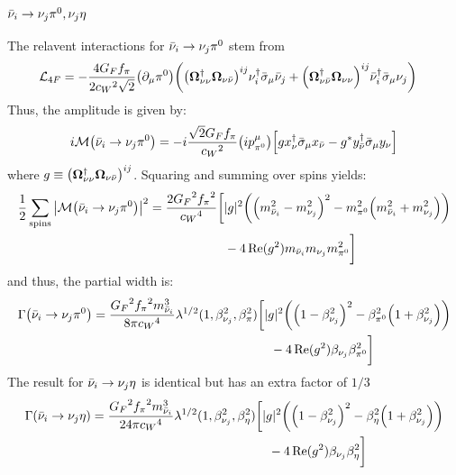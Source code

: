
\subsubsection{\texorpdfstring{\(\bar{\nu}_{i}\to\nu_{j}\pi^{0},\nu_{j}\eta\)}{RH-Neutrino to LH-Neutrino and Neutral Pion}}

The relavent interactions for \(\bar{\nu}_{i}\to\nu_{j}\pi^{0}\) stem from
\begin{align}
    \mathcal{L}_{4F} & = -\frac{4{G_{F}}{f_{\pi}}}{2{c_{W}}^{2}\sqrt{2}}\qty(\partial_{\mu}{\pi^{0}})
    \qty(\qty(\bm{\Omega}_{\nu\nu}^{\dagger}\bm{\Omega}_{\nu\bar{\nu}})^{ij}
    \nu_{i}^{\dagger}
    \bar{\sigma}_{\mu}
    \bar{\nu}_{j}
    +\qty(\bm{\Omega}_{\nu\bar{\nu}}^{\dagger}\bm{\Omega}_{\nu\nu})^{ij}\bar{\nu}_{i}^{\dagger}
    \bar{\sigma}_{\mu}
    \nu_{j}
    )
\end{align}
Thus, the amplitude is given by:
\begin{align}
    i\mathcal{M}\qty(\bar{\nu}_{i}\to\nu_{j}\pi^{0})
    =
    -i\frac{\sqrt{2}{G_{F}}{f_{\pi}}}{{c_{W}}^{2}}\qty(i p^{\mu}_{{\pi^{0}}})
    \qty[
    gx^{\dagger}_{\nu}\bar{\sigma}_{\mu}x_{\bar{\nu}}
    -
    g^{*}y^{\dagger}_{\bar{\nu}}\bar{\sigma}_{\mu}y_{\nu}
    ]
\end{align}
where \(g\equiv \qty(\bm{\Omega}_{\nu\nu}^{\dagger}\bm{\Omega}_{\nu\bar{\nu}})^{ij}\).
Squaring and summing over spins yields:
\begin{align}
    \frac{1}{2}\sum_{\mathrm{spins}}\qty|\mathcal{M}\qty(\bar{\nu}_{i}\to\nu_{j}\pi^{0})|^{2}
     & =
    \frac{2{G_{F}}^{2}{f_{\pi}}^{2}}{{c_{W}}^{4}}
    \bigg{[}
    |g|^{2}\qty(\qty(m_{\bar{\nu}_{i}}^{2}-m_{\nu_{j}}^{2})^{2}
    - m_{{\pi^{0}}}^{2}\qty(m_{\bar{\nu}_{i}}^{2}+m_{\nu_{j}}^{2})) \\
     & \qquad\qquad\qquad
    -4\Re(g^2)m_{\bar{\nu}_{i}}m_{\nu_{j}}m_{{\pi^{0}}}^{2}
    \bigg{]}\notag
\end{align}
and thus, the partial width is:
\begin{align}
    \Gamma\qty(\bar{\nu}_{i}\to\nu_{j}\pi^{0})
    =
    \frac{{G_{F}}^{2}{f_{\pi}}^{2}m^{3}_{\bar{\nu}_{i}}}{8\pi {c_{W}}^{4}}
    \lambda^{1/2}(1,\beta_{\nu_{j}}^2,\beta_{\pi}^{2})
     &
    \bigg{[}
    |g|^{2}\qty(\qty(1-\beta_{\nu_{j}}^{2})^{2}
    - \beta_{{\pi^{0}}}^{2}\qty(1+\beta_{\nu_{j}}^{2})) \\
     & \quad
    -4\Re(g^2)\beta_{\nu_{j}}\beta_{{\pi^{0}}}^{2}
    \bigg{]}\notag
\end{align}
The result for \(\bar{\nu}_{i}\to\nu_{j}\eta\) is identical but has an extra factor of
\(1/3\)
\begin{align}
    \Gamma\qty(\bar{\nu}_{i}\to\nu_{j}\eta)
    =
    \frac{{G_{F}}^{2}{f_{\pi}}^{2}m^{3}_{\bar{\nu}_{i}}}{24\pi {c_{W}}^{4}}
    \lambda^{1/2}(1,\beta_{\nu_{j}}^2,\beta_{\eta}^{2})
     &
    \bigg{[}
    |g|^{2}\qty(\qty(1-\beta_{\nu_{j}}^{2})^{2}
    - \beta_{\eta}^{2}\qty(1+\beta_{\nu_{j}}^{2})) \\
     & \quad
    -4\Re(g^2)\beta_{\nu_{j}}\beta_{\eta}^{2}
    \bigg{]}\notag
\end{align}




